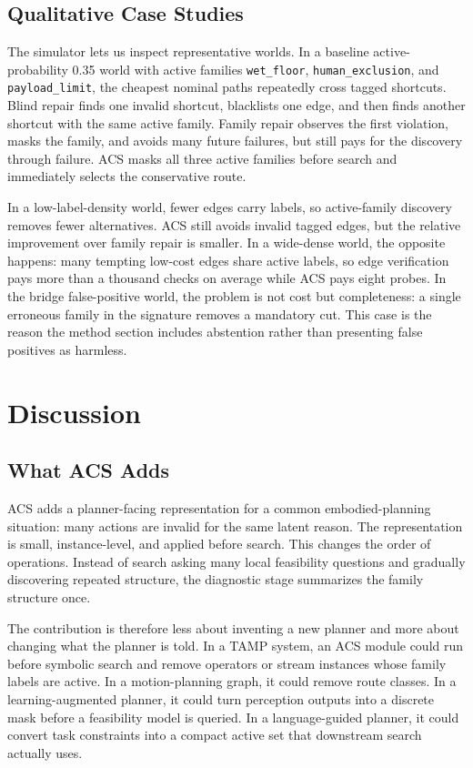 \documentclass{article}
\newcommand{\ACS}{\textsc{ACS}}
\begin{document}
\subsection{Qualitative Case Studies}

The simulator lets us inspect representative worlds. In a baseline active-probability 0.35 world with active families \texttt{wet\_floor}, \texttt{human\_exclusion}, and \texttt{payload\_limit}, the cheapest nominal paths repeatedly cross tagged shortcuts. Blind repair finds one invalid shortcut, blacklists one edge, and then finds another shortcut with the same active family. Family repair observes the first violation, masks the family, and avoids many future failures, but still pays for the discovery through failure. \ACS{} masks all three active families before search and immediately selects the conservative route.

In a low-label-density world, fewer edges carry labels, so active-family discovery removes fewer alternatives. \ACS{} still avoids invalid tagged edges, but the relative improvement over family repair is smaller. In a wide-dense world, the opposite happens: many tempting low-cost edges share active labels, so edge verification pays more than a thousand checks on average while \ACS{} pays eight probes. In the bridge false-positive world, the problem is not cost but completeness: a single erroneous family in the signature removes a mandatory cut. This case is the reason the method section includes abstention rather than presenting false positives as harmless.

\section{Discussion}

\subsection{What \ACS{} Adds}

\ACS{} adds a planner-facing representation for a common embodied-planning situation: many actions are invalid for the same latent reason. The representation is small, instance-level, and applied before search. This changes the order of operations. Instead of search asking many local feasibility questions and gradually discovering repeated structure, the diagnostic stage summarizes the family structure once.

The contribution is therefore less about inventing a new planner and more about changing what the planner is told. In a TAMP system, an \ACS{} module could run before symbolic search and remove operators or stream instances whose family labels are active. In a motion-planning graph, it could remove route classes. In a learning-augmented planner, it could turn perception outputs into a discrete mask before a feasibility model is queried. In a language-guided planner, it could convert task constraints into a compact active set that downstream search actually uses.
\end{document}

